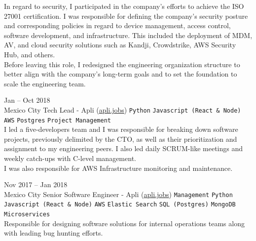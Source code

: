 \documentclass[9pt]{developercv} %
\begin{document}
\begin{entrylist}
{            In regard to security, I participated in the company's efforts to achieve the ISO 27001 
            certification. I was responsible for defining the company's security posture and 
            corresponding policies in regard to device management, access control, software 
            development, and infrastructure. This included the deployment of MDM, AV, and cloud 
            security solutions such as Kandji, Crowdstrike, AWS Security Hub, and others.\\

            Before leaving this role, I redesigned the engineering organization structure to better 
            align with the company's long-term goals and to set the foundation to scale the 
            engineering team.
        }

    \entry
        {
            Jan -- Oct 2018
            \\\footnotesize{Mexico City}
        }
        {Tech Lead - Apli ({\href{https://apli.jobs/}{\underline{apli.jobs}}})}
        {
            \texttt{Python}
            \slashsep\texttt{Javascript (React \& Node)}
            \slashsep\texttt{AWS}
            \slashsep\texttt{Postgres}
            \slashsep\texttt{Project Management}
        }
        {\\

            I led a five-developers team and I was responsible for breaking down software projects, 
            previously delimited by the CTO, as well as their prioritization and assignment to my 
            engineering peers. I also led daily SCRUM-like meetings and weekly catch-ups with C-level
            management.\\
            
            I was also responsible for AWS Infrastructure monitoring and maintenance.
        }

    \entry
        {
            Nov 2017 -- Jan 2018
            \\\footnotesize{Mexico City}
        }
        {Senior Software Engineer - Apli ({\href{https://apli.jobs/}{\underline{apli.jobs}}})}
        {
            \texttt{Management}
            \slashsep\texttt{Python}
            \slashsep\texttt{Javascript (React \& Node)}
            \slashsep\texttt{AWS}
            \slashsep\texttt{Elastic Search}
            \slashsep\texttt{SQL (Postgres)}
            \slashsep\texttt{MongoDB}
            \slashsep\texttt{Microservices}
        }
        {\\
            Responsible for designing software solutions for internal operations teams along with 
            leading bug hunting efforts.
        }


\end{entrylist}
\end{document}

